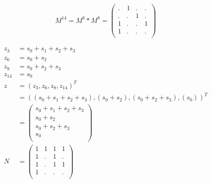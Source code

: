\documentclass[12pt,a4paper,final,onecolumn,oneside]{article}
\begin{document}
\begin{enumerate}[label=(\alph*)]
    \begin{equation*}
        M^{14} = M^6 * M^8 =
        \begin{pmatrix}
        . & 1 & . & . \\
        . & . & 1 & . \\
        1 & . & . & 1 \\
        1 & . & . & . \\
        \end{pmatrix}
    \end{equation*}
            
    
    \begin{equation*}
    \begin{aligned}
        z_3 &= s_0 + s_1 + s_2 + s_3 \\
        z_6 &= s_0 + s_2 \\
        z_8 &= s_0 + s_2 + s_3 \\
        z_{14} &= s_0 \\
        z &= (z_3, z_6, z_8, z_{14})^T \\ &= ((s_0 + s_1 + s_2 + s_3), (s_0 + s_2), (s_0 + s_2 + s_3), (s_0))^T \\
        &=
        \begin{pmatrix}
            s_0 + s_1 + s_2 + s_3 \\
            s_0 + s_2 \\
            s_0 + s_2 + s_3 \\
            s_0 \\
        \end{pmatrix} \\
        N &=
        \begin{pmatrix}
        1 & 1 & 1 & 1 \\
        1 & . & 1 & . \\
        1 & . & 1 & 1 \\
        1 & . & . & . \\
        \end{pmatrix}
    \end{aligned}
    \end{equation*}


\end{enumerate}
\end{document}
